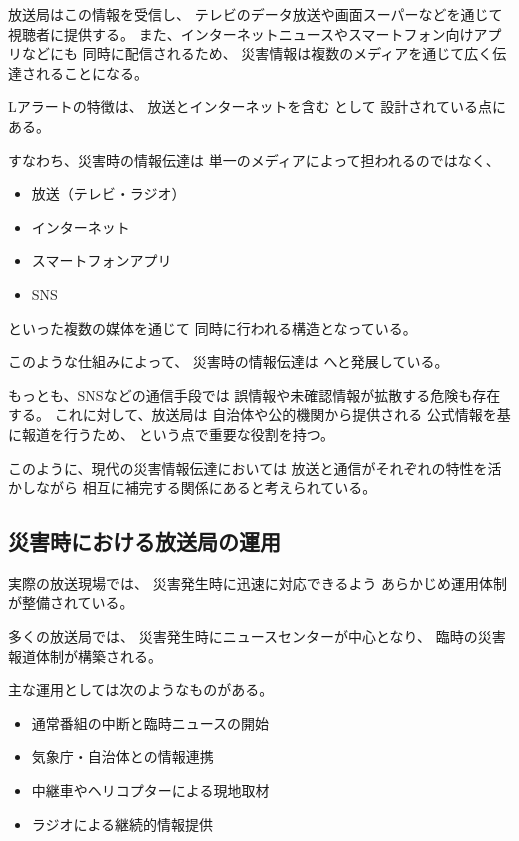 放送局はこの情報を受信し、
テレビのデータ放送や画面スーパーなどを通じて
視聴者に提供する。
また、インターネットニュースやスマートフォン向けアプリなどにも
同時に配信されるため、
災害情報は複数のメディアを通じて広く伝達されることになる。

Lアラートの特徴は、
放送とインターネットを含む
として
設計されている点にある。

すなわち、災害時の情報伝達は
単一のメディアによって担われるのではなく、

\begin{itemize}
  \item 放送（テレビ・ラジオ）
  \item インターネット
  \item スマートフォンアプリ
  \item SNS
\end{itemize}

といった複数の媒体を通じて
同時に行われる構造となっている。

このような仕組みによって、
災害時の情報伝達は
へと発展している。

もっとも、SNSなどの通信手段では
誤情報や未確認情報が拡散する危険も存在する。
これに対して、放送局は
自治体や公的機関から提供される
公式情報を基に報道を行うため、
という点で重要な役割を持つ。

このように、現代の災害情報伝達においては
放送と通信がそれぞれの特性を活かしながら
相互に補完する関係にあると考えられている。


\subsection{災害時における放送局の運用}

実際の放送現場では、
災害発生時に迅速に対応できるよう
あらかじめ運用体制が整備されている。

多くの放送局では、
災害発生時にニュースセンターが中心となり、
臨時の災害報道体制が構築される。

主な運用としては次のようなものがある。

\begin{itemize}
  \item 通常番組の中断と臨時ニュースの開始
  \item 気象庁・自治体との情報連携
  \item 中継車やヘリコプターによる現地取材
  \item ラジオによる継続的情報提供
\end{itemize}

